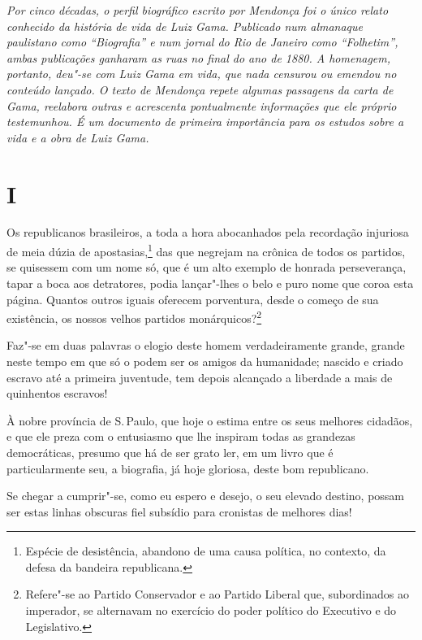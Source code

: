 \begin{flushleft}
{\footnotesize\itshape
Por cinco décadas, o perfil biográfico escrito por Mendonça foi o
único relato conhecido da história de vida de Luiz Gama. Publicado num
almanaque paulistano como ``Biografia'' e num jornal do Rio de Janeiro
como ``Folhetim'', ambas publicações ganharam as ruas no final do ano de
1880. A homenagem, portanto, deu"-se com Luiz Gama em vida, que nada
censurou ou emendou no conteúdo lançado. O texto de Mendonça repete
algumas passagens da carta de Gama, reelabora outras e acrescenta
pontualmente informações que ele próprio testemunhou. É um documento de
primeira importância para os estudos sobre a vida e a obra de Luiz Gama.
}
\end{flushleft}

\section*{I}

\noindent{}Os republicanos brasileiros, a toda a hora abocanhados pela recordação
injuriosa de meia dúzia de apostasias,\footnote{Espécie de desistência,
  abandono de uma causa política, no contexto, da defesa da bandeira
  republicana.} das que negrejam na crônica de todos os partidos, se
quisessem com um nome só, que é um alto exemplo de honrada perseverança,
tapar a boca aos detratores, podia lançar"-lhes o belo e puro nome que
coroa esta página. Quantos outros iguais oferecem porventura, desde o
começo de sua existência, os nossos velhos partidos
monárquicos?\footnote{Refere"-se ao Partido Conservador e ao Partido
  Liberal que, subordinados ao imperador, se alternavam no exercício do
  poder político do Executivo e do Legislativo.}

Faz"-se em duas palavras o elogio deste homem verdadeiramente grande,
grande neste tempo em que só o podem ser os amigos da humanidade;
nascido e criado escravo até a primeira juventude, tem depois alcançado
a liberdade a mais de quinhentos escravos!

À nobre província de S.\,Paulo, que hoje o estima entre os seus melhores
cidadãos, e que ele preza com o entusiasmo que lhe inspiram todas as
grandezas democráticas, presumo que há de ser grato ler, em um livro que
é particularmente seu, a biografia, já hoje gloriosa, deste bom
republicano.

Se chegar a cumprir"-se, como eu espero e desejo, o seu elevado destino,
possam ser estas linhas obscuras fiel subsídio para cronistas de
melhores dias!

